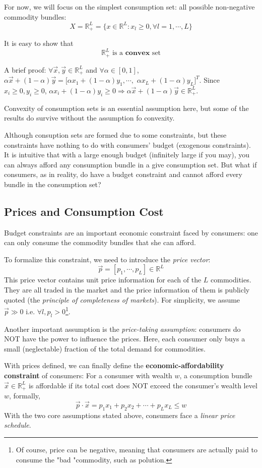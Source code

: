 For now, we will focus on the simplest consumption set: all possible non-negative commodity bundles:
$$X=\mathbb{R}^L_+=\{x\in \mathbb{R}^L: x_l\geq 0,\forall l=1,\cdots, L\}$$

It is easy to show that
$$\mathbb{R}^L_+ \text{ is a }\textbf{convex} \text{ set}$$

A brief proof: $\forall \vec{x},\vec{y}\in \mathbb{R}^L_+$ and $\forall\alpha \in [0,1]$, $\alpha\vec{x}+(1-\alpha)\vec{y}=[\alpha x_1+(1-\alpha)y_1,\cdots,$ $\alpha x_L+(1-\alpha)y_L]^T$. Since $x_i\geq 0,y_i\geq 0$, $\alpha x_i+(1-\alpha)y_i\geq 0 \Rightarrow\alpha\vec{x}+(1-\alpha)\vec{y}\in \mathbb{R}^L_+$.

Convexity of consumption sets is an essential assumption here, but some of the results do survive without the assumption fo convexity.

Although consuption sets are formed due to some constraints, but these constraints have nothing to do with consumers' budget (exogenous constraints). It is intuitive that with a large enough budget (infinitely large if you may), you can always afford any consumption bundle in a give consumption set. But what if consumers, as in reality, do have a budget constraint and cannot afford every bundle in the consumption set?

\subsection{Prices and Consumption Cost}
Budget constraints are an important economic constraint faced by consumers: one can only consume the commodity bundles that she can afford.

To formalize this constraint, we need to introduce the \textit{price vector}: 
$$\vec{p}=\left[p_1,\cdots,p_L\right]\in \mathbb{R}^L$$
This price vector contains unit price information for each of the $L$ commodities. They are all traded in the market and the price information of them is publicly quoted (the \textit{principle of completeness of markets}).
For simplicity, we assume $\vec{p}\gg 0$ i.e. $\forall l,p_l>0$\footnote{Of course, price can be negative, meaning that consumers are actually paid to consume the "bad "commodity, such as polution.}.

Another important assumption is the \textit{price-taking assumption}: consumers do NOT have the power to influence the prices. Here, each consumer only buys a small (neglectable) fraction of the total demand for commodities.

With prices defined, we can finally define the \textbf{economic-affordability constraint} of consumers: For a consumer with wealth $w$, a consumption bundle $\vec{x}\in \mathbb{R}^L_+$ is affordable if its total cost does NOT exceed the consumer's wealth level $w$, formally, $$\vec{p}\cdot \vec{x}=p_1x_1+p_2x_2+\cdots+p_Lx_L\leq w$$
With the two core assumptions stated above, consumers face a \textit{linear price schedule}.